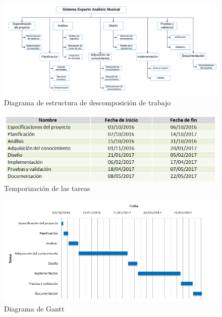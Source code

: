 \begin{figure}[H]
	\centering
	\hspace*{-1.2in}
	\includegraphics[scale=0.5]{imagenes/diagrama_edt.png}
	\caption{Diagrama de estructura de descomposición de trabajo}
	\label{fig1.4.1}
\end{figure}

\begin{figure}[H]
	\centering
	\hspace*{-0.6in}
	\includegraphics[scale=0.7]{imagenes/diagrama_tareas.png}
	\caption{Temporización de las tareas}
	\label{fig1.4.2}
\end{figure}

\bigskip
\bigskip

\begin{figure}[H]
	\centering
	\hspace*{-0.6in}
	\includegraphics[scale=0.80]{imagenes/diagrama_gantt.png}
	\caption{Diagrama de Gantt}
	\label{fig1.4.3}
\end{figure}